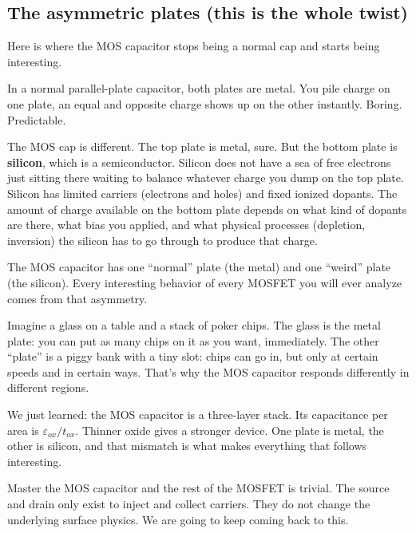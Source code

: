 \documentclass[11pt]{article}
\begin{document}
\subsection{The asymmetric plates (this is the whole twist)}

Here is where the MOS capacitor stops being a normal cap and starts being interesting.

In a normal parallel-plate capacitor, both plates are metal. You pile charge on one plate, an equal and opposite charge shows up on the other instantly. Boring. Predictable.

The MOS cap is different. The top plate is metal, sure. But the bottom plate is \textbf{silicon}, which is a semiconductor. Silicon does not have a sea of free electrons just sitting there waiting to balance whatever charge you dump on the top plate. Silicon has limited carriers (electrons and holes) and fixed ionized dopants. The amount of charge available on the bottom plate depends on what kind of dopants are there, what bias you applied, and what physical processes (depletion, inversion) the silicon has to go through to produce that charge.

\begin{keyidea}
The MOS capacitor has one ``normal'' plate (the metal) and one ``weird'' plate (the silicon). Every interesting behavior of every MOSFET you will ever analyze comes from that asymmetry.
\end{keyidea}

\begin{hook}
Imagine a glass on a table and a stack of poker chips. The glass is the metal plate: you can put as many chips on it as you want, immediately. The other ``plate'' is a piggy bank with a tiny slot: chips can go in, but only at certain speeds and in certain ways. That's why the MOS capacitor responds differently in different regions.
\end{hook}

\begin{pause}
We just learned: the MOS capacitor is a three-layer stack. Its capacitance per area is $\varepsilon_{ox}/t_{ox}$. Thinner oxide gives a stronger device. One plate is metal, the other is silicon, and that mismatch is what makes everything that follows interesting.
\end{pause}

\begin{checkpoint}
Master the MOS capacitor and the rest of the MOSFET is trivial. The source and drain only exist to inject and collect carriers. They do not change the underlying surface physics. We are going to keep coming back to this.
\end{checkpoint}
\end{document}

